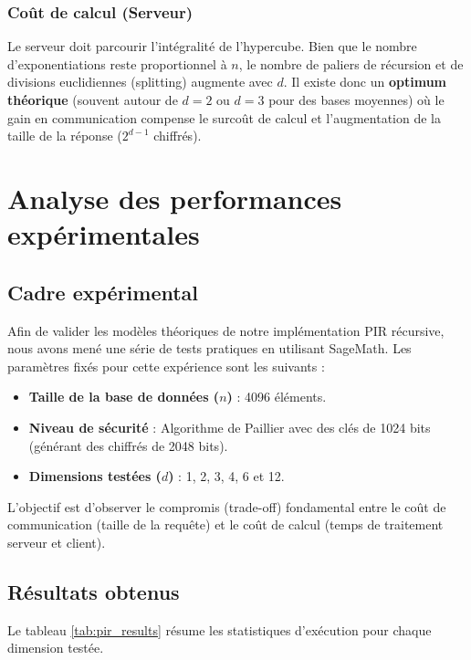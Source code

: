 \documentclass[12pt,a4paper]{report}
\begin{document}
\subsubsection{Coût de calcul (Serveur)}
Le serveur doit parcourir l'intégralité de l'hypercube. Bien que le nombre d'exponentiations reste proportionnel à $n$, le nombre de paliers de récursion et de divisions euclidiennes (splitting) augmente avec $d$. Il existe donc un \textbf{optimum théorique} (souvent autour de $d=2$ ou $d=3$ pour des bases moyennes) où le gain en communication compense le surcoût de calcul et l'augmentation de la taille de la réponse ($2^{d-1}$ chiffrés).
\section{Analyse des performances expérimentales}

\subsection{Cadre expérimental}
Afin de valider les modèles théoriques de notre implémentation PIR récursive, nous avons mené une série de tests pratiques en utilisant SageMath. Les paramètres fixés pour cette expérience sont les suivants :
\begin{itemize}
    \item \textbf{Taille de la base de données ($n$)} : 4096 éléments.
    \item \textbf{Niveau de sécurité} : Algorithme de Paillier avec des clés de 1024 bits (générant des chiffrés de 2048 bits).
    \item \textbf{Dimensions testées ($d$)} : 1, 2, 3, 4, 6 et 12.
\end{itemize}

L'objectif est d'observer le compromis (trade-off) fondamental entre le coût de communication (taille de la requête) et le coût de calcul (temps de traitement serveur et client).

\subsection{Résultats obtenus}

Le tableau \ref{tab:pir_results} résume les statistiques d'exécution pour chaque dimension testée.
\end{document}

